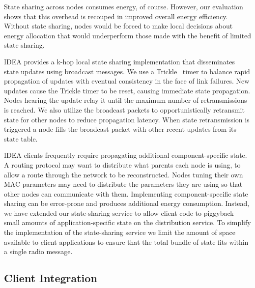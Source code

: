 State sharing across nodes consumes energy, of course. However, our
evaluation shows that this overhead is recouped in improved overall energy
efficiency. Without state sharing, nodes would be forced to make local
decisions about energy allocation that would underperform those made with the
benefit of limited state sharing.

IDEA provides a k-hop local state sharing implementation that disseminates
state updates using broadcast messages. We use a Trickle~\cite{trickle} timer
to balance rapid propagation of updates with eventual consistency in the face
of link failures. New updates cause the Trickle timer to be reset, causing
immediate state propagation. Nodes hearing the update relay it until the
maximum number of retransmissions is reached. We also utilize the broadcast
packets to opportunistically retransmit state for other nodes to reduce
propagation latency. When state retransmission is triggered a node fills the
broadcast packet with other recent updates from its state table.

IDEA clients frequently require propagating additional component-specific
state. A routing protocol may want to distribute what parents each node is
using, to allow a route through the network to be reconstructed. Nodes tuning
their own MAC parameters may need to distribute the parameters they are using
so that other nodes can communicate with them. Implementing
component-specific state sharing can be error-prone and produces additional
energy consumption. Instead, we have extended our state-sharing service to
allow client code to piggyback small amounts of application-specific state on
the distribution service. To simplify the implementation of the state-sharing
service we limit the amount of space available to client applications to
ensure that the total bundle of state fits within a single radio message.

\subsection{Client Integration}

